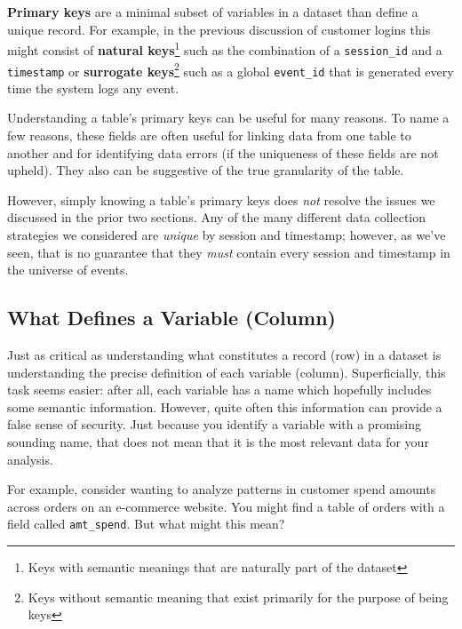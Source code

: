 \documentclass[
]{krantz}
\begin{document}
\textbf{Primary keys} are a minimal subset of variables in a dataset than define a unique record.
For example, in the previous discussion of customer logins this might consist of \textbf{natural keys}\footnote{Keys with semantic meanings that are naturally part of the dataset} such as the combination of a \texttt{session\_id} and a \texttt{timestamp} or \textbf{surrogate keys}\footnote{Keys without semantic meaning that exist primarily for the purpose of being keys} such as a global \texttt{event\_id} that is generated every time the system logs any event.

Understanding a table's primary keys can be useful for many reasons.
To name a few reasons, these fields are often useful for linking data from one table to another and for identifying data errors (if the uniqueness of these fields are not upheld).
They also can be suggestive of the true granularity of the table.

However, simply knowing a table's primary keys does \emph{not} resolve the issues we discussed in the prior two sections.
Any of the many different data collection strategies we considered are \emph{unique} by session and timestamp;
however, as we've seen, that is no guarantee that they \emph{must} contain every session and timestamp in the universe of events.

\hypertarget{what-defines-a-variable-column}{%
\subsection{What Defines a Variable (Column)}\label{what-defines-a-variable-column}}

Just as critical as understanding what constitutes a record (row) in a dataset is understanding the precise definition of each variable (column).
Superficially, this task seems easier: after all, each variable has a name which hopefully includes some semantic information. However, quite often this information can provide a false sense of security.
Just because you identify a variable with a promising sounding name, that does not mean that it is the most relevant data for your analysis.

For example, consider wanting to analyze patterns in customer spend amounts across orders on an e-commerce website.
You might find a table of orders with a field called \texttt{amt\_spend}. But what might this mean?
\end{document}
